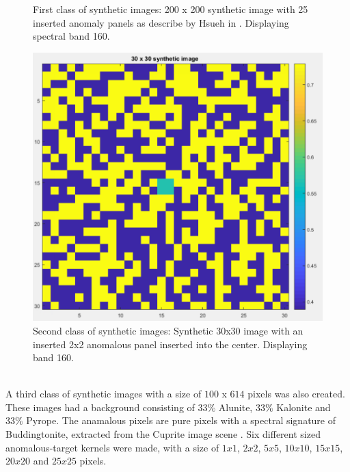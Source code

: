 \begin{figure}[H]
\begin{minipage}[]{.5\linewidth}
\end{minipage}


\caption{First class of synthetic images: 200 x 200 synthetic image with 25 inserted anomaly panels as describe by Hsueh in \cite{hsueh_master_thesis}. Displaying spectral band 160. }
\label{fig:hsueh_image}
\end{figure}

\begin{figure}[H]
\centering
   \includegraphics[scale=0.4]{images/AD_testing/synthetic_images/30_30_anomaly_image.PNG}
  \caption{Second class of synthetic images: Synthetic 30x30 image with an inserted 2x2 anomalous panel inserted into the center. Displaying band 160. } 
  \label{fig:synthetic_30_30}
\end{figure}


\\
A third class of synthetic images with a size of $100$ x $614$ pixels was also created. These images had a background consisting of $33\%$ Alunite, $33\%$ Kalonite and $33\%$ Pyrope. The anamalous pixels are pure pixels with a spectral signature of Buddingtonite, extracted from the Cuprite image scene \cite{ground_truth_cuprite}. Six different sized anomalous-target kernels were made, with a size of $1x1$, $2x2$, $5x5$, $10x10$, $15x15$, $20x20$ and $25x25$ pixels.




